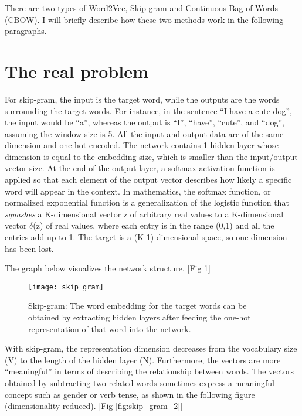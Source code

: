 There are two types of Word2Vec, Skip-gram and Continuous Bag of Words (CBOW). I will briefly describe how these two methods work in the following paragraphs.

\section{The real problem}

For skip-gram, the input is the target word, while the outputs are the words surrounding the target words. For instance, in the sentence “I have a cute dog”, the input would be “a”, whereas the output is “I”, “have”, “cute”, and “dog”, assuming the window size is 5. All the input and output data are of the same dimension and one-hot encoded. The network contains 1 hidden layer whose dimension is equal to the embedding size, which is smaller than the input/output vector size. At the end of the output layer, a
softmax activation function is applied so that each element of the output vector describes how likely a specific word will appear in the context.
In mathematics, the softmax function, or normalized exponential function is a generalization of the logistic function that \textit{squashes} a K-dimensional vector z of arbitrary real values to a K-dimensional vector $\delta$(z) of real values, where each entry is in the range (0,1) and all the entries add up to 1. The target is a (K-1)-dimensional space, so one dimension has been lost. \cite{wiki:softmax}

The graph below visualizes the network structure. [Fig \ref{fig:skip_gram}]

\begin{figure}[ht]
	\centering
	\texttt{[image: skip\_gram]}
	\caption[Skip-gram evaluation]{Skip-gram: The word embedding for the target words can be obtained by extracting hidden layers after feeding the one-hot representation of that word into the network.}
	\label{fig:skip_gram}
\end{figure}

With skip-gram, the representation dimension decreases from the vocabulary size (V) to the length of the hidden layer (N). Furthermore, the vectors are more “meaningful” in terms of describing the relationship between words. The vectors obtained by subtracting two related words sometimes express a meaningful concept such as gender or verb tense, as shown in the following figure (dimensionality reduced). [Fig \ref{fig:skip_gram_2}]

